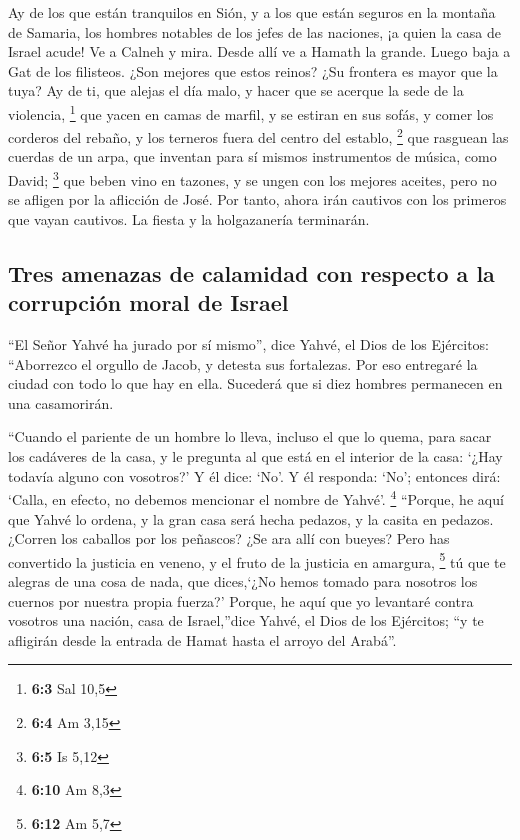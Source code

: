  Ay de los que están tranquilos en Sión, y a los que están
seguros en la montaña de Samaria, los hombres notables de los jefes de
las naciones, ¡a quien la casa de Israel acude!  Ve a
Calneh y mira. Desde allí ve a Hamath la grande. Luego baja a Gat de los
filisteos. ¿Son mejores que estos reinos? ¿Su frontera es mayor que la
tuya?  Ay de ti, que alejas el día malo, y hacer que se
acerque la sede de la violencia, \footnote{\textbf{6:3} Sal 10,5}
 que yacen en camas de marfil, y se estiran en sus sofás,
y comer los corderos del rebaño, y los terneros fuera del centro del
establo, \footnote{\textbf{6:4} Am 3,15}  que rasguean las
cuerdas de un arpa, que inventan para sí mismos instrumentos de música,
como David; \footnote{\textbf{6:5} Is 5,12}  que beben
vino en tazones, y se ungen con los mejores aceites, pero no se afligen
por la aflicción de José.  Por tanto, ahora irán cautivos
con los primeros que vayan cautivos. La fiesta y la holgazanería
terminarán.

\hypertarget{tres-amenazas-de-calamidad-con-respecto-a-la-corrupciuxf3n-moral-de-israel}{%
\subsection{Tres amenazas de calamidad con respecto a la corrupción
moral de
Israel}\label{tres-amenazas-de-calamidad-con-respecto-a-la-corrupciuxf3n-moral-de-israel}}

 ``El Señor Yahvé ha jurado por sí mismo'', dice Yahvé, el
Dios de los Ejércitos: ``Aborrezco el orgullo de Jacob, y detesta sus
fortalezas. Por eso entregaré la ciudad con todo lo que hay en ella.
 Sucederá que si diez hombres permanecen en una
casamorirán.

 ``Cuando el pariente de un hombre lo lleva, incluso el
que lo quema, para sacar los cadáveres de la casa, y le pregunta al que
está en el interior de la casa: `¿Hay todavía alguno con vosotros?' Y él
dice: `No'. Y él responda: `No'; entonces dirá: `Calla, en efecto, no
debemos mencionar el nombre de Yahvé'. \footnote{\textbf{6:10} Am 8,3}
 ``Porque, he aquí que Yahvé lo ordena, y la gran casa
será hecha pedazos, y la casita en pedazos.  ¿Corren los
caballos por los peñascos? ¿Se ara allí con bueyes? Pero has convertido
la justicia en veneno, y el fruto de la justicia en amargura,
\footnote{\textbf{6:12} Am 5,7}  tú que te alegras de una
cosa de nada, que dices,`¿No hemos tomado para nosotros los cuernos por
nuestra propia fuerza?'  Porque, he aquí que yo levantaré
contra vosotros una nación, casa de Israel,''dice Yahvé, el Dios de los
Ejércitos; ``y te afligirán desde la entrada de Hamat hasta el arroyo
del Arabá''.

